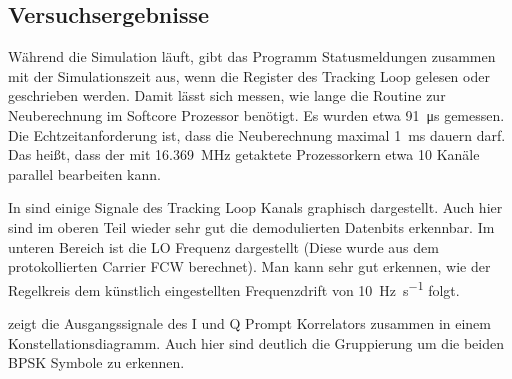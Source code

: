 \subsection{Versuchsergebnisse}
Während die Simulation läuft, gibt das Programm Statusmeldungen zusammen mit der Simulationszeit aus, wenn die Register des Tracking Loop gelesen oder geschrieben werden. Damit lässt sich messen, wie lange die Routine zur Neuberechnung im Softcore Prozessor benötigt. Es wurden etwa \SI{91}{\micro\second} gemessen. Die Echtzeitanforderung ist, dass die Neuberechnung maximal \SI{1}{\milli\second} dauern darf. Das heißt, dass der mit \SI{16.369}{\mega\hertz} getaktete Prozessorkern etwa 10 Kanäle parallel bearbeiten kann.

In  sind einige Signale des Tracking Loop Kanals graphisch dargestellt. Auch hier sind im oberen Teil wieder sehr gut die demodulierten Datenbits erkennbar. Im unteren Bereich ist die LO Frequenz dargestellt (Diese wurde aus dem protokollierten Carrier FCW berechnet). Man kann sehr gut erkennen, wie der Regelkreis dem künstlich eingestellten Frequenzdrift von \SI{10}{\hertz\per\second} folgt.

 zeigt die Ausgangssignale des I und Q Prompt Korrelators zusammen in einem Konstellationsdiagramm. Auch hier sind deutlich die Gruppierung um die beiden BPSK Symbole zu erkennen.


